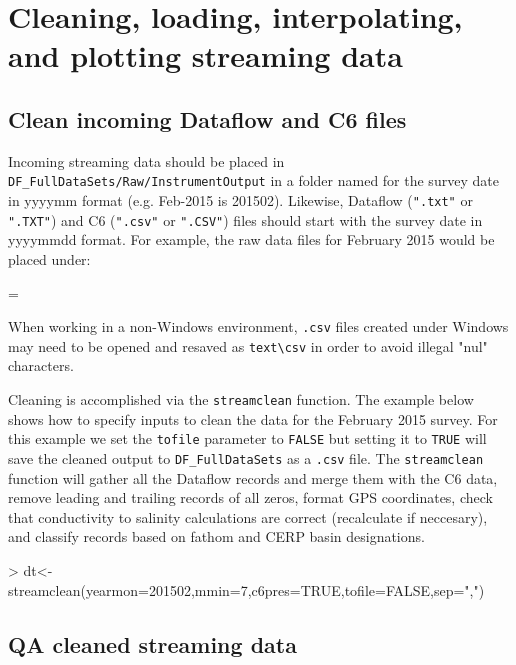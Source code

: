\documentclass[12pt]{article}
\newenvironment{warning}
{\par\begin{mdframed}[linewidth=2pt,linecolor=red]
\begin{list}{}{\leftmargin=1cm
  \labelwidth=\leftmargin}\item[\Large\ding{43}]}
{\end{list}\end{mdframed}\par}
\begin{document}
\section{Cleaning, loading, interpolating, and plotting streaming data}
\subsection{Clean incoming Dataflow and C6 files}

Incoming streaming data should be placed in \verb|DF_FullDataSets|\texttt{/Raw/InstrumentOutput} in a folder named for the survey date in yyyymm format (e.g. Feb-2015 is 201502). Likewise, Dataflow (\texttt{".txt"} or \texttt{".TXT"}) and C6 (\texttt{".csv"} or \texttt{".CSV"})  files should start with the survey date in yyyymmdd format. For example, the raw data files for February 2015 would be placed under:


\begin{warning}
When working in a non-Windows environment, \texttt{.csv} files created under Windows may need to be opened and resaved as \texttt{text}\verb|\csv| in order to avoid illegal "nul" characters.
\end{warning}

\vspace{15pt}
Cleaning is accomplished via the \nohyphens{\texttt{streamclean}} function. The example below shows how to specify inputs to clean the data for the February 2015 survey. For this example we set the \texttt{tofile} parameter to \texttt{FALSE} but setting it to \texttt{TRUE} will save the cleaned output to \verb|DF_FullDataSets| as a \texttt{.csv} file. The \texttt{streamclean} function will gather all the Dataflow records and merge them with the C6 data, remove leading and trailing records of all zeros, format GPS coordinates, check that conductivity to salinity calculations are correct (recalculate if neccesary), and classify records based on fathom and CERP basin designations.

\begin{Schunk}
\begin{Sinput}
> dt<-streamclean(yearmon=201502,mmin=7,c6pres=TRUE,tofile=FALSE,sep=",")
\end{Sinput}
\end{Schunk}
\subsection{QA cleaned streaming data}
\end{document}
